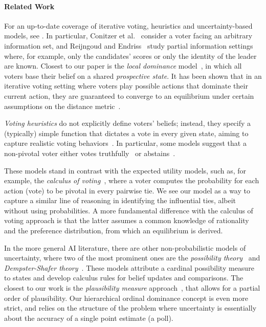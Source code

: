 \documentclass[letterpaper]{article} %
\begin{document}
\paragraph{Related Work}\label{relWork}
For an up-to-date coverage of iterative voting, heuristics and uncertainty-based models, see \cite{ME17}. 
In particular, Conitzer et al.~ consider a voter facing an arbitrary information set, and Reijngoud and Endriss~ study partial information settings where, for example, only the candidates' scores or only the identity of the leader are known. Closest to our paper is the \emph{local dominance} model~\cite{MLR14}, in which all voters base their belief on a shared \emph{prospective state}. It has been shown that in an iterative voting setting where voters play possible actions that dominate their current action, they are guaranteed to converge to an equilibrium under certain assumptions on the distance metric~\cite{MLR14,Mei15}.

\emph{Voting heuristics} do not explicitly define voters' beliefs; instead, they specify a (typically) simple function that dictates a vote in every given state, aiming to capture realistic voting behaviors~\cite{RE12,GLRVW13}. In particular, some models suggest that a non-pivotal voter either votes truthfully~\cite{DL10} or abstains~\cite{DE10}.

These models stand in contrast with the expected utility models, such as, for example, the \emph{calculus of voting}~\cite{riker1968theory,MW93}, where a voter computes the probability for each action (vote) to be pivotal in every pairwise tie. We see our model as a way to capture a similar line of reasoning in identifying the influential ties, albeit without using probabilities. A more fundamental difference with the calculus of voting approach is that the latter assumes a common knowledge of rationality and the preference distribution, from which an equilibrium is derived.

In the more general AI literature, there are other non-probabilistic models of uncertainty, where two of the most prominent ones are the \emph{possibility theory}~\cite{DFP96} and \emph{Dempster-Shafer theory}~\cite{shafer1976mathematical}. These models attribute a cardinal possibility measure to states and develop calculus rules for belief updates and comparisons. The closest to our work is the \emph{plausibility measure} approach~\cite{Hal97}, that allows for a partial order of plausibility. Our hierarchical ordinal dominance concept is even more strict, and relies on the structure of the problem where uncertainty is essentially about the accuracy of a single point estimate (a poll). 
\end{document}
